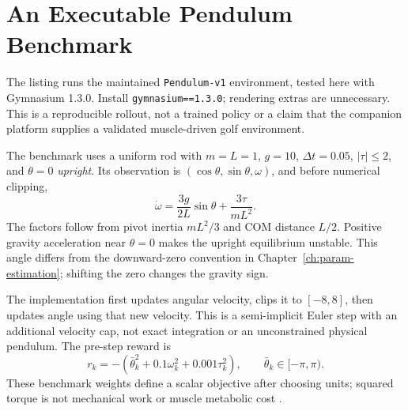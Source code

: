 \section{An Executable Pendulum Benchmark}

The listing runs the maintained \texttt{Pendulum-v1} environment, tested here
with Gymnasium 1.3.0. Install \texttt{gymnasium==1.3.0}; rendering extras are
unnecessary. This is a reproducible rollout, not a trained policy or a claim
that the companion platform supplies a validated muscle-driven golf environment.

The benchmark uses a uniform rod with $m=L=1$, $g=10$, $\Delta t=0.05$,
$|\tau|\leq2$, and $\theta=0$ \emph{upright}. Its observation is
$(\cos\theta,\sin\theta,\omega)$, and before numerical clipping,
\begin{equation}
  \dot\omega=\frac{3g}{2L}\sin\theta+\frac{3\tau}{mL^2}.
\end{equation}
The factors follow from pivot inertia $mL^2/3$ and COM distance $L/2$.
Positive gravity acceleration near $\theta=0$ makes the upright equilibrium
unstable. This angle differs from the downward-zero convention in
Chapter~\ref{ch:param-estimation}; shifting the zero changes the gravity sign.

The implementation first updates angular velocity, clips it to $[-8,8]$,
then updates angle using that new velocity. This is a semi-implicit Euler
step with an additional velocity cap, not exact integration or an unconstrained
physical pendulum. The pre-step reward is
\begin{equation}
  r_k=-\left(\bar\theta_k^2+0.1\omega_k^2+0.001\tau_k^2\right),
  \qquad \bar\theta_k\in[-\pi,\pi).
\end{equation}
These benchmark weights define a scalar objective after choosing units;
squared torque is not mechanical work or muscle metabolic cost
\cite{GymnasiumPendulumReview,GymnasiumPendulumSourceReview}.

